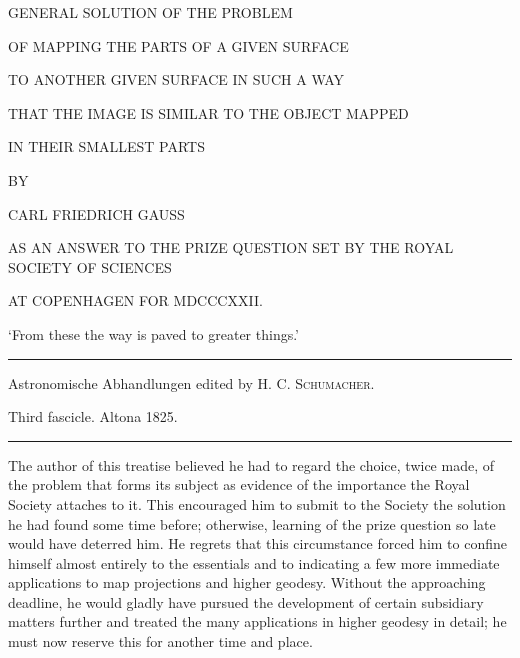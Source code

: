 \clearpage
{}
\thispagestyle{empty}
\vspace*{.35in}
\begin{center}
{\large GENERAL SOLUTION OF THE PROBLEM}\par\bigskip
{\Large OF MAPPING THE PARTS OF A GIVEN SURFACE}\par\bigskip
TO ANOTHER GIVEN SURFACE IN SUCH A WAY\par\bigskip
THAT THE IMAGE IS SIMILAR TO THE OBJECT MAPPED\par\bigskip
IN THEIR SMALLEST PARTS\par\vspace{28pt}
BY\par\vspace{28pt}
{\large CARL FRIEDRICH GAUSS}\par\vspace{30pt}
{\small AS AN ANSWER TO THE PRIZE QUESTION SET BY THE ROYAL SOCIETY OF SCIENCES\par
AT COPENHAGEN FOR MDCCCXXII.}\par\bigskip
\end{center}
\begin{flushright}‘From these the way is paved to greater things.’\end{flushright}
\vfill
\begin{center}
\rule{.8\linewidth}{.3pt}\par\smallskip
Astronomische Abhandlungen edited by H. C. \textsc{Schumacher}.\par
Third fascicle. Altona 1825.\par\smallskip
\rule{.8\linewidth}{.3pt}
\end{center}
\clearpage
{}
The author of this treatise believed he had to regard the choice, twice made, of the problem that forms its subject as evidence of the importance the Royal Society attaches to it. This encouraged him to submit to the Society the solution he had found some time before; otherwise, learning of the prize question so late would have deterred him. He regrets that this circumstance forced him to confine himself almost entirely to the essentials and to indicating a few more immediate applications to map projections and higher geodesy. Without the approaching deadline, he would gladly have pursued the development of certain subsidiary matters further and treated the many applications in higher geodesy in detail; he must now reserve this for another time and place.

